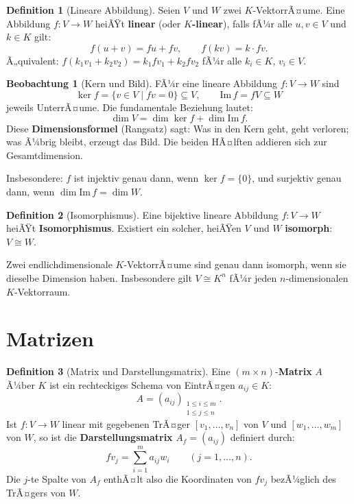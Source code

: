 ﻿\documentclass[a4paper,12pt]{report}
\theoremstyle{definition}
\newtheorem{definition}{Definition}
\newtheorem{beobachtung}{Beobachtung}
\begin{document}
\begin{definition}[Lineare Abbildung]
    Seien $V$ und $W$ zwei $K$-VektorrÃ¤ume. Eine Abbildung
    $f : V \to W$ heiÃŸt \textbf{linear} (oder \textbf{$K$-linear}), falls
    fÃ¼r alle $u, v \in V$ und $k \in K$ gilt:
    \[
        f(u + v) = fu + fv, \qquad f(kv) = k \cdot fv.
    \]
    Ã„quivalent: $f(k_1 v_1 + k_2 v_2) = k_1 f v_1 + k_2 f v_2$ fÃ¼r alle
    $k_i \in K$, $v_i \in V$.
\end{definition}

\begin{beobachtung}[Kern und Bild]
    FÃ¼r eine lineare Abbildung $f : V \to W$ sind
    \[
        \ker f = \{v \in V \mid fv = 0\} \subseteq V, \qquad
        \mathrm{Im}\, f = fV \subseteq W
    \]
    jeweils UnterrÃ¤ume. Die fundamentale Beziehung lautet:
    \[
        \dim V = \dim \ker f + \dim \mathrm{Im}\, f.
    \]
    Diese \textbf{Dimensionsformel} (Rangsatz) sagt: Was in den Kern geht,
    geht verloren; was Ã¼brig bleibt, erzeugt das Bild. Die beiden HÃ¤lften
    addieren sich zur Gesamtdimension.

    Insbesondere: $f$ ist injektiv genau dann, wenn $\ker f = \{0\}$, und
    surjektiv genau dann, wenn $\dim \mathrm{Im}\, f = \dim W$.
\end{beobachtung}

\begin{definition}[Isomorphismus]
    Eine bijektive lineare Abbildung $f : V \to W$ heiÃŸt
    \textbf{Isomorphismus}. Existiert ein solcher, heiÃŸen $V$ und $W$
    \textbf{isomorph}: $V \cong W$.

    Zwei endlichdimensionale $K$-VektorrÃ¤ume sind genau dann isomorph,
    wenn sie dieselbe Dimension haben. Insbesondere gilt $V \cong K^n$
    fÃ¼r jeden $n$-dimensionalen $K$-Vektorraum.
\end{definition}

\section{Matrizen}

\begin{definition}[Matrix und Darstellungsmatrix]
    Eine $(m \times n)$-\textbf{Matrix} $A$ Ã¼ber $K$ ist ein rechteckiges
    Schema von EintrÃ¤gen $a_{ij} \in K$:
    \[
        A = (a_{ij})_{\substack{1 \le i \le m \\ 1 \le j \le n}}.
    \]
    Ist $f : V \to W$ linear mit gegebenen TrÃ¤ger $[v_1, \dots, v_n]$ von $V$
    und $[w_1, \dots, w_m]$ von $W$, so ist die \textbf{Darstellungsmatrix}
    $A_f = (a_{ij})$ definiert durch:
    \[
        f v_j = \sum_{i=1}^m a_{ij} w_i \qquad (j = 1, \dots, n).
    \]
    Die $j$-te Spalte von $A_f$ enthÃ¤lt also die Koordinaten von $fv_j$
    bezÃ¼glich des TrÃ¤gers von $W$.
\end{definition}
\end{document}
